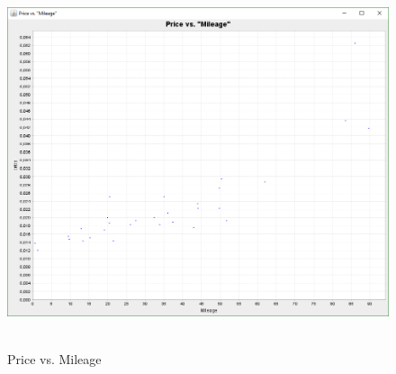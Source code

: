 	\begin{figure}[h]
		\centering
		\includegraphics[width=1\textwidth]{Figures/price_vs_mileage}~\\
		\caption{Price vs. Mileage}
		\label{fig:price_vs_mileage}
	\end{figure}
